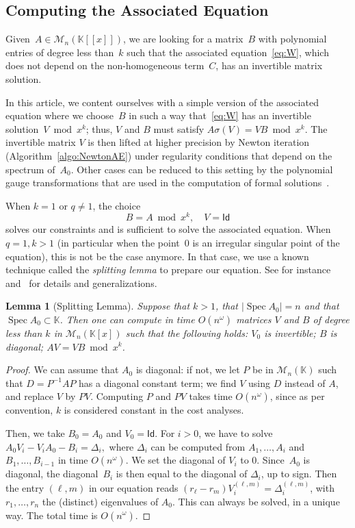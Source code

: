 \documentclass[]{sig-alternate}
\def\Spec{\operatorname{Spec}}
\def\K {\ensuremath{\mathbb{K}}}
\def\Id{\ensuremath{\mathsf{Id}}}
\def\mA {\ensuremath{{A}}}
\def\mB {\ensuremath{{B}}}
\def\mD {\ensuremath{{D}}}
\def\mP {\ensuremath{{P}}}
\def\mV {\ensuremath{{V}}}
\newtheorem{Lemma}{Lemma}
\begin{document}
\subsection{Computing the Associated Equation}\label{ssec:mB}

Given~$A\in\mathscr{M}_n(\K[[x]])$, we are looking for a matrix~$B$
with polynomial entries of degree less than~$k$ such that the
associated equation~\eqref{eq:W}, which does not depend on the
non-homogeneous term~$C$, has an invertible matrix
solution.

In this article, we content ourselves with a simple version of the
associated equation where we choose~$B$ in such a way
that~\eqref{eq:W} has an invertible solution~$V\bmod x^k$; thus, $V$
and $B$ must satisfy $\mA \sigma(\mV)=\mV \mB \bmod x^k$. The
invertible matrix $V$ is then lifted at higher precision by Newton
iteration (Algorithm~\ref{algo:NewtonAE}) under regularity conditions
that depend on the spectrum of~$A_0$. Other cases can be reduced to
this setting by the polynomial gauge transformations that are used in the
computation of formal
solutions~\cite{BaBrPf10,Wasow65}.

When $k=1$ or $q\ne 1$, the
choice
\[B=A\bmod x^k,\quad V=\Id\]
solves our constraints and is sufficient to solve the associated
equation. When~$q=1,k>1$ (in particular when the point~0 is an irregular singular
point of the equation), this is not be the case anymore. In that
case, we use a known technique called the {\em splitting lemma} to
prepare our equation. See for instance~\cite[Ch.~3.2]{Balser00} and~\cite{BaBrPf10} for
details and generalizations.

\begin{Lemma}[Splitting Lemma]\label{splittinglemma}
Suppose that $k>1$, that $|\Spec A_0|=n$ and that $\Spec A_0 \subset
\K$. Then one can compute in time $O(n^\omega)$ matrices $\mV$ and
$\mB$ of degree less than $k$ in $\mathscr{M}_n(\K[x])$ such that the
following holds: 
$\mV_0$ is invertible;
$\mB$ is diagonal;
$\mA\mV=\mV \mB \bmod x^k$.
\end{Lemma}
\begin{proof}
We can assume that $\mA_0$ is diagonal: if not, we let $\mP$ be in
$\mathscr{M}_n(\K)$ such that $\mD=\mP^{-1}\mA\mP$ has a diagonal
constant term; we find $\mV$ using $\mD$ instead of $\mA$, and replace
$\mV$ by $\mP \mV$. Computing $\mP$ and $\mP\mV$ takes time
$O(n^\omega)$, since as per convention, $k$ is considered constant in
the cost analyses.

Then, we take $\mB_0=\mA_0$ and $\mV_0=\Id$.  For $i>0$, we have to
solve $\mA_0 \mV_i-\mV_i \mA_0 -\mB_i = \Delta_i,$ where $\Delta_i$
can be computed from $\mA_1,\dots,\mA_i$ and $\mB_1,\dots,\mB_{i-1}$
in time $O(n^\omega)$. We set the
diagonal of $V_i$ to 0. Since~$A_0$ is diagonal, the diagonal~$B_i$ is
then equal to the diagonal of $\Delta_i$, up to sign. Then the entry
$(\ell,m)$ in our equation reads
$(r_\ell-r_m)V_i^{(\ell,m)}=\Delta_i^{(\ell,m)}$, with
$r_1,\dots,r_n$ the (distinct) eigenvalues of $A_0$. 
This can always be solved, in a unique way. The total time is
$O(n^\omega)$.
\end{proof}
\end{document}
